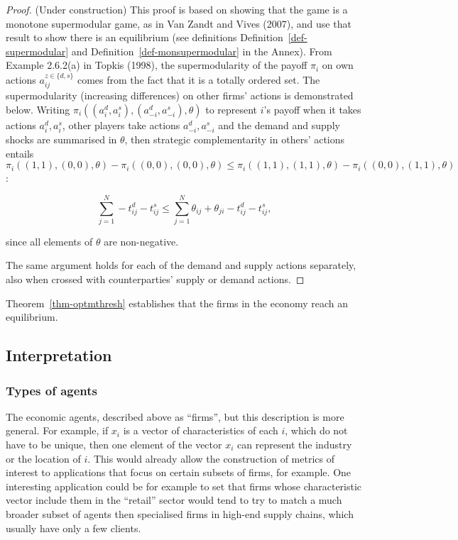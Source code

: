 \documentclass[
]{article}
\theoremstyle{definition}
\theoremstyle{plain}
\theoremstyle{remark}
\begin{document}
\begin{proof}
(Under construction) This proof is based on showing that the game is a
monotone supermodular game, as in Van Zandt and Vives (2007), and use
that result to show there is an equilibrium (see definitions
Definition~\ref{def-supermodular} and
Definition~\ref{def-monsupermodular} in the Annex). From Example
2.6.2(a) in Topkis (1998), the supermodularity of the payoff \(\pi_i\)
on own actions \(a_{ij}^{z \in \{d, s\}}\) comes from the fact that it
is a totally ordered set. The supermodularity (increasing differences)
on other firms' actions is demonstrated below. Writing
\(\pi_i((a_i^d, a_i^s),(a_{-i}^d, a_{-i}^s), \theta)\) to represent
\(i\)'s payoff when it takes actions \(a_i^d, a_i^s\), other players
take actions \(a_{-i}^d, a_{-i}^s\) and the demand and supply shocks are
summarised in \(\theta\), then strategic complementarity in others'
actions entails
\(\pi_i((1,1), (0,0), \theta) - \pi_i((0,0), (0,0), \theta) \leq \pi_i((1,1), (1,1), \theta) - \pi_i((0,0), (1,1), \theta)\):

\[
\sum_{j=1}^N -t_{ij}^d -t_{ij}^s \leq \sum_{j=1}^N \theta_{ij} + \theta_{ji} - t_{ij}^d - t_{ij}^s,
\]

since all elements of \(\theta\) are non-negative.

The same argument holds for each of the demand and supply actions
separately, also when crossed with counterparties' supply or demand
actions.
\end{proof}

Theorem~\ref{thm-optmthresh} establishes that the firms in the economy
reach an equilibrium.

\subsection{Interpretation}\label{sec-interpretation}

\subsubsection{Types of agents}\label{types-of-agents}

The economic agents, described above as ``firms'', but this description
is more general. For example, if \(x_i\) is a vector of characteristics
of each \(i\), which do not have to be unique, then one element of the
vector \(x_i\) can represent the industry or the location of \(i\). This
would already allow the construction of metrics of interest to
applications that focus on certain subsets of firms, for example. One
interesting application could be for example to set that firms whose
characteristic vector include them in the ``retail'' sector would tend
to try to match a much broader subset of agents then specialised firms
in high-end supply chains, which usually have only a few clients.
\end{document}
